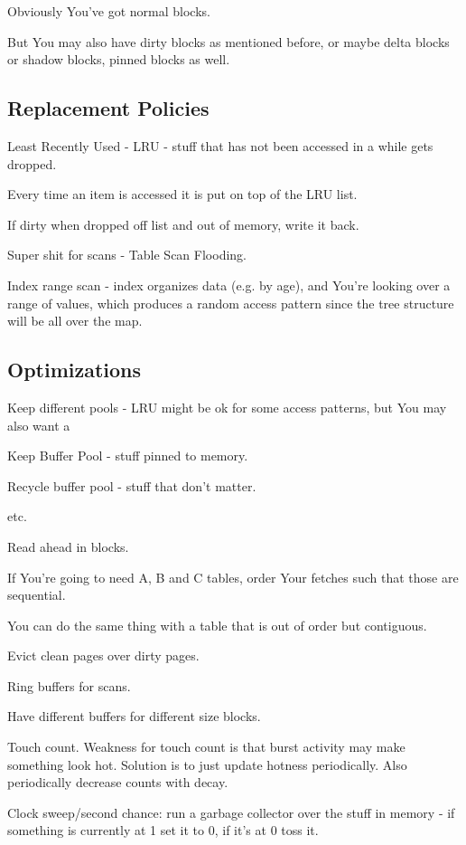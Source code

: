 \documentclass{article}
\begin{document}
			Obviously You've got normal blocks.
			
			But You may also have dirty blocks as mentioned before, or maybe delta blocks or shadow blocks, pinned blocks as well.
			
		\subsection{Replacement Policies}
		
			Least Recently Used - LRU - stuff that has not been accessed in a while gets dropped.
			
			Every time an item is accessed it is put on top of the LRU list.
			
			If dirty when dropped off list and out of memory, write it back.
			
			Super shit for scans - Table Scan Flooding.
			
			Index range scan - index organizes data (e.g. by age), and You're looking over a range of values, which produces a random access pattern since the tree structure will be all over the map.
			
		\subsection{Optimizations}
		
			Keep different pools - LRU might be ok for some access patterns, but You may also want a 
			
			Keep Buffer Pool - stuff pinned to memory.
			
			Recycle buffer pool - stuff that don't matter.
			
			etc.
			
			Read ahead in blocks.
			
			If You're going to need A, B and C tables, order Your fetches such that those are sequential.
			
			You can do the same thing with a table that is out of order but contiguous.
			
			Evict clean pages over dirty pages.
			
			Ring buffers for scans.
			
			Have different buffers for different size blocks.
			
			Touch count. Weakness for touch count is that burst activity may make something look hot. Solution is to just update hotness periodically. Also periodically decrease counts with decay.
			
			Clock sweep/second chance: run a garbage collector over the stuff in memory - if something is currently at 1 set it to 0, if it's at 0 toss it.
			
\end{document}
